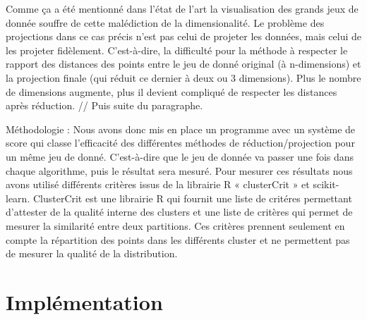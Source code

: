 Comme ça a été mentionné dans l’état de l’art la visualisation des grands jeux de donnée souffre de cette malédiction de la dimensionalité. 
Le problème des projections dans ce cas précis n’est pas celui de projeter les données, mais celui de les projeter fidèlement. 
C’est-à-dire, la difficulté pour la méthode à respecter le rapport des distances des points entre le jeu de donné original (à n-dimensions) et la projection finale (qui réduit ce dernier à deux ou 3 dimensions). 
Plus le nombre de dimensions augmente, plus il devient compliqué de respecter les distances après réduction. // Puis suite du paragraphe.

\medskip

Méthodologie : 
Nous avons donc mis en place un programme avec un système de score qui classe l’efficacité des différentes méthodes de réduction/projection pour un même jeu de donné. 
C’est-à-dire que le jeu de donnée va passer une fois dans chaque algorithme, puis le résultat sera mesuré.
Pour mesurer ces résultats nous avons utilisé différents critères issus de la librairie R « clusterCrit » et scikit-learn.
ClusterCrit est une librairie R qui fournit une liste de critéres permettant d'attester de la qualité interne des clusters et une liste de critères qui permet 
de mesurer la similarité entre deux partitions. Ces critères prennent seulement en compte la répartition des points dans les différents cluster et ne permettent pas de 
mesurer la qualité de la distribution.



\section{Implémentation}

